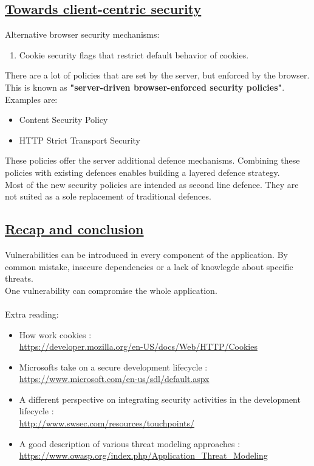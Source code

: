 \documentclass[titlepage]{article}
\begin{document}
    \subsection{\href{https://youtu.be/GzuRY6Rop9s}{Towards client-centric security}}
    Alternative browser security mechanisms:
    \begin{enumerate}
        \item Cookie security flags that restrict default behavior of cookies.
    \end{enumerate}
    There are a lot of policies that are set by the server, but enforced by the browser. This is known as \textbf{"server-driven browser-enforced security policies"}. Examples are:
    \begin{itemize}
        \item Content Security Policy
        \item HTTP Strict Transport Security
    \end{itemize}
    These policies offer the server additional defence mechanisms. Combining these policies with existing defences enables building a layered defence strategy.\\
    Most of the new security policies are intended as second line defence. They are not suited as a sole replacement of traditional defences.
    \subsection{\href{https://youtu.be/hUaRiui-gJE}{Recap and conclusion}}
    Vulnerabilities can be introduced in every component of the application. By common mistake, insecure dependencies or a lack of knowlegde about specific threats.\\
    One vulnerability can compromise the whole application.\\\\
    Extra reading:
    \begin{itemize}
        \item How work cookies :\\ \url{https://developer.mozilla.org/en-US/docs/Web/HTTP/Cookies}
        \item Microsofts take on a secure development lifecycle :\\ \url{https://www.microsoft.com/en-us/sdl/default.aspx}
        \item A different perspective on integrating security activities in the development lifecycle :\\ \url{http://www.swsec.com/resources/touchpoints/}
        \item A good description of various threat modeling approaches :\\ \url{https://www.owasp.org/index.php/Application_Threat_Modeling}
    \end{itemize}
    \newpage
\end{document}
